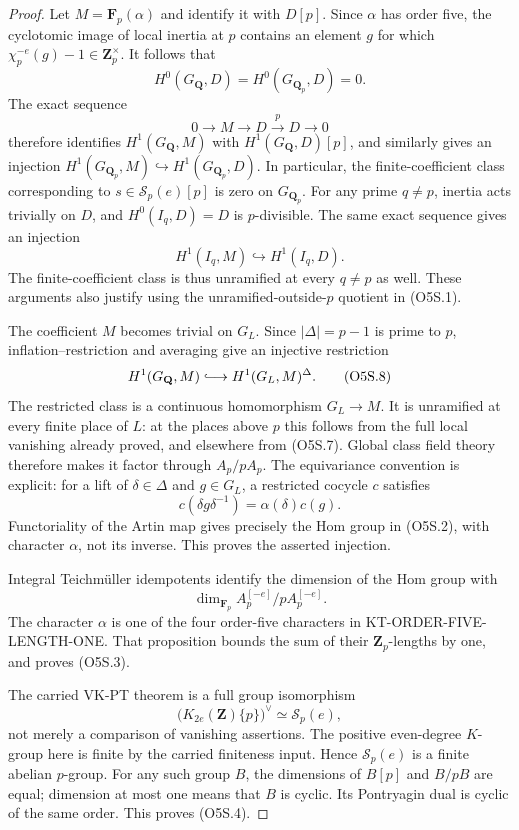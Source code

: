 \begin{proof}
Let $M=\mathbf F_p(\alpha)$ and identify it with $D[p]$.
Since $\alpha$ has order five, the cyclotomic image of local
inertia at $p$ contains an element $g$ for which
$\chi_p^{-e}(g)-1\in\mathbf Z_p^\times$.
It follows that
\[
 H^0(G_{\mathbf Q},D)=H^0(G_{\mathbf Q_p},D)=0.
 \tag{O5S.5}
\]
The exact sequence
\[
          0\longrightarrow M\longrightarrow D
            \xrightarrow{\ p\ }D\longrightarrow0
 \tag{O5S.6}
\]
therefore identifies $H^1(G_{\mathbf Q},M)$ with
$H^1(G_{\mathbf Q},D)[p]$, and similarly gives an injection
$H^1(G_{\mathbf Q_p},M)\hookrightarrow
H^1(G_{\mathbf Q_p},D)$.
In particular, the finite-coefficient class corresponding to
$s\in\mathcal S_p(e)[p]$ is zero on $G_{\mathbf Q_p}$.
For any prime $q\ne p$, inertia acts trivially on $D$,
and $H^0(I_q,D)=D$ is $p$-divisible.
The same exact sequence gives an injection
\[
                    H^1(I_q,M)\hookrightarrow H^1(I_q,D).
 \tag{O5S.7}
\]
The finite-coefficient class is thus unramified at every
$q\ne p$ as well.  These arguments also justify using the
unramified-outside-$p$ quotient in (O5S.1).

The coefficient $M$ becomes trivial on $G_L$.
Since $|\Delta|=p-1$ is prime to $p$, inflation--restriction
and averaging give an injective restriction
\[
 H^1(G_{\mathbf Q},M)\lhook\joinrel\longrightarrow
 H^1(G_L,M)^\Delta.
 \tag{O5S.8}
\]
The restricted class is a continuous homomorphism $G_L\to M$.
It is unramified at every finite place of $L$: at the places
above $p$ this follows from the full local vanishing already
proved, and elsewhere from (O5S.7).
Global class field theory therefore makes it factor through
$A_p/pA_p$.
The equivariance convention is explicit: for a lift of
$\delta\in\Delta$ and $g\in G_L$, a restricted cocycle $c$
satisfies
\[
                  c(\delta g\delta^{-1})=\alpha(\delta)c(g).
 \tag{O5S.9}
\]
Functoriality of the Artin map gives precisely the Hom group
in (O5S.2), with character $\alpha$, not its inverse.
This proves the asserted injection.

Integral Teichm\"uller idempotents identify the dimension of
the Hom group with
\[
          \dim_{\mathbf F_p}
             A_p^{[-e]}/pA_p^{[-e]}.
 \tag{O5S.10}
\]
The character $\alpha$ is one of the four order-five characters
in KT-ORDER-FIVE-LENGTH-ONE.  That proposition bounds the sum
of their $\mathbf Z_p$-lengths by one, and proves (O5S.3).

The carried VK-PT theorem is a full group isomorphism
\[
              \bigl(K_{2e}(\mathbf Z)\{p\}\bigr)^\vee
                       \simeq\mathcal S_p(e),
 \tag{O5S.11}
\]
not merely a comparison of vanishing assertions.
The positive even-degree $K$-group here is finite by the
carried finiteness input.  Hence $\mathcal S_p(e)$ is a finite
abelian $p$-group.  For any such group $B$, the dimensions of
$B[p]$ and $B/pB$ are equal; dimension at most one means that
$B$ is cyclic.  Its Pontryagin dual is cyclic of the same
order.  This proves (O5S.4).
\end{proof}

